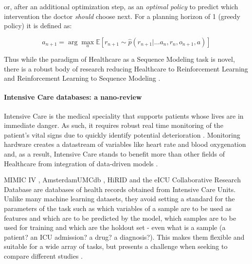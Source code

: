or, after an additional optimization step, as an \emph{optimal policy} to predict which intervention the doctor \emph{should} choose next.
For a planning horizon of 1 (greedy policy) it is defined as:

\begin{equation}
    a_{n+1} = \arg \max_a \mathbb{E} [r_{n+1} \sim \hat{p}(r_{n+1} | \dots a_n, r_n, o_{n+1}, a)]
\end{equation}

Thus while the paradigm of Healthcare as a Sequence Modeling task is novel, there is a robust body of research reducing Healthcare to Reinforcement Learning \cite{yuReinforcementLearningHealthcare2021} and Reinforcement Learning to Sequence Modeling \cite{chenDecisionTransformerReinforcement2021, jannerOfflineReinforcementLearning2021, schmidhuberReinforcementLearningUpside2020}. 

\paragraph{Intensive Care databases: a nano-review}

Intensive Care is the medical speciality that supports patients whose lives are in immediate danger.
As such, it requires robust real time monitoring of the patient's vital signs due to quickly identify potential deterioration \cite{Bailey2013trial, Blount2010Real, Bockholt2022Real, Dimitrios1999Distributed, Fried2000Some, Mao2012integrated, Prgomet2016Vital, Vincent2018Improving}.
Monitoring hardware creates a datastream of variables like heart rate and blood oxygenation and, as a result, Intensive Care stands to benefit more than other fields of Healthcare from integration of data-driven models \cite{nunezreizBigDataAnalysis2019}.

MIMIC IV \cite{johnsonMIMICIVFreelyAccessible2023}, AmsterdamUMCdb \cite{amsterdamumcdb-a}, HiRID \cite{yecheHiRIDICUBenchmarkComprehensiveMachine} and the eICU Collaborative Research Database \cite{pollard2018a} are databases of health records obtained from Intensive Care Units.
Unlike many machine learning datasets, they avoid setting a standard for the parameters of the task such as which variables of a sample are to be used as features and which are to be predicted by the model, which samples are to be used for training and which are the holdout set - even what is a sample (a patient? an ICU admission? a drug? a diagnosis?). This makes them flexible and suitable for a wide array of tasks, but presents a challenge when seeking to compare different studies \cite{mcdermottReproducibilityMachineLearning2021}.

